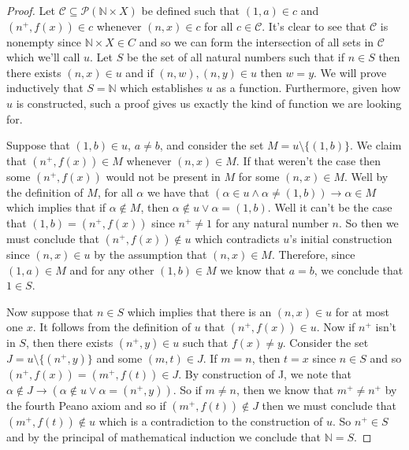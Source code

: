 \documentclass{article}
\theoremstyle{definition}
\theoremstyle{definition}
\theoremstyle{plain}
\theoremstyle{remark}
\theoremstyle{plain}
\theoremstyle{remark}
\theoremstyle{plain}
\theoremstyle{plain}
\theoremstyle{plain}
\begin{document}
\begin{proof}
Let \( \mathcal{C} \subseteq \mathcal{P} (\mathbb{N} \times X )\) be defined 
such that \( (1, a) \in c \) and \( (n^{+}, f(x)) \in c \) whenever 
\( ( n, x ) \in c \) for all \( c \in \mathcal{C} \). It's clear to see that 
\( \mathcal{C} \) is nonempty since \( \mathbb{N} \times X \in C \) and so we 
can form the intersection of all sets in \( \mathcal{C} \) which we'll call 
\( u \). Let \( S \) be the set of all natural numbers such that if 
\( n \in S \) then there exists \( (n, x) \in u \) and if 
\( (n, w), (n,y) \in u\) then \( w = y \). We will prove inductively that 
\( S = \mathbb{N} \) which establishes \( u \) as a function. Furthermore, 
given how \( u \) is constructed, such a proof gives us exactly the kind of 
function we are looking for. 

Suppose that \( (1, b) \in u \), \( a \neq b\), and consider the set 
\( M = u \setminus \{ (1,b) \} \).  We claim that \( (n^{+}, f(x)) \in M \) 
whenever \( ( n, x ) \in M \). If that weren't the case then some 
\( (n^{+}, f(x)) \) would not be present in \( M \) for some \( (n,x) \in M \). 
Well by the definition of \( M \), for all \( \alpha \) we have that 
\( (\alpha \in u \land \alpha \neq (1,b)) \rightarrow \alpha \in M \) which 
implies that if \( \alpha \not\in M \), then 
\( \alpha \not\in u \lor \alpha = (1, b) \). Well  it can't be the case that 
\( (1,b) = (n^{+},f(x)) \) since \( n^{+} \neq 1 \) for any natural number 
\( n \). So then we must conclude that \( (n^{+}, f(x)) \not\in u \) which 
contradicts \( u \)'s initial construction since \( (n,x) \in u \) by the 
assumption that \( (n,x) \in M \). Therefore, since \((1,a) \in M \) and for any 
other \( (1,b) \in M \) we know that \( a = b \), we conclude that 
\( 1 \in S \). 

Now suppose that \( n \in S \) which implies that there is an \( (n,x) \in u \) 
for at most one \( x \). It follows from the definition of \( u \) that 
\( (n^{+}, f(x)) \in u \). Now if \( n^{+} \) isn't in \( S \), then there 
exists \( (n^{+}, y) \in u \) such that \( f(x) \neq y \). Consider the set 
\( J = u \setminus \{(n^{+},y)\} \) and some \( (m, t) \in J \). If \( m = n \), 
then \( t = x \) since \( n \in S \) and so 
\( (n^{+}, f(x)) = (m^{+},f(t)) \in J \). By construction of J, we note that 
\( \alpha \not\in J \rightarrow (\alpha \not\in u \lor \alpha = (n^{+},y))\). 
So if \( m \neq n \), then we know that \( m^{+} \neq n^{+} \) by the fourth 
Peano axiom and so if \( (m^{+}, f(t)) \not\in J \) then we must conclude that 
\( (m^{+}, f(t)) \not\in u \) which is a contradiction to the construction of 
\( u \). So \( n^{+} \in S \) and by the principal of mathematical induction we 
conclude that \( \mathbb{N}  = S \). 
\end{proof}
\end{document}

